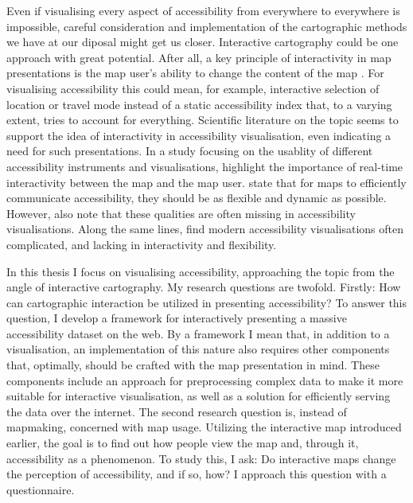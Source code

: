 Even if visualising every aspect of accessibility
from everywhere to everywhere is impossible,
careful consideration and implementation
of the cartographic methods we have at our diposal might get us closer.
Interactive cartography could be one approach with great potential.
After all, a key principle of interactivity in map presentations is
the map user's ability to change the content of the map \parencite{rot2013b}.
For visualising accessibility this could mean, for example,
interactive selection of location or travel mode instead of
a static accessibility index that, to a varying extent,
tries to account for everything.
Scientific literature on the topic seems to support the idea of
interactivity in accessibility visualisation,
even indicating a need for such presentations.
In a study focusing on the usablity of
different accessibility instruments and visualisations,  %
\textcite{te2014} highlight the importance of
real-time interactivity between the map and the map user.
\textcite{but2018} state that for maps to efficiently communicate accessibility,
they should be as flexible and dynamic as possible.
However, \textcite{but2018} also note that
these qualities are often missing in accessibility visualisations.
Along the same lines, \textcite{paj2021} find modern accessibility visualisations often complicated,
and lacking in interactivity and flexibility.


In this thesis I focus on visualising accessibility,
approaching the topic from the angle of interactive cartography.
My research questions are twofold.
Firstly: How can cartographic interaction be utilized in presenting accessibility?
To answer this question,
I develop a framework for interactively presenting a massive accessibility dataset on the web.
By a framework I mean that, in addition to a visualisation,
an implementation of this nature also requires other components
that, optimally, should be crafted with the map presentation in mind.
These components include
an approach for preprocessing complex data
to make it more suitable for interactive visualisation,
as well as a solution for efficiently serving the data over the internet.
The second research question is,
instead of mapmaking, concerned with map usage.
Utilizing the interactive map introduced earlier,
the goal is to find out how people view the map and,
through it, accessibility as a phenomenon.
To study this, I ask:
Do interactive maps change the perception of accessibility, and if so, how?
I approach this question with a questionnaire.

